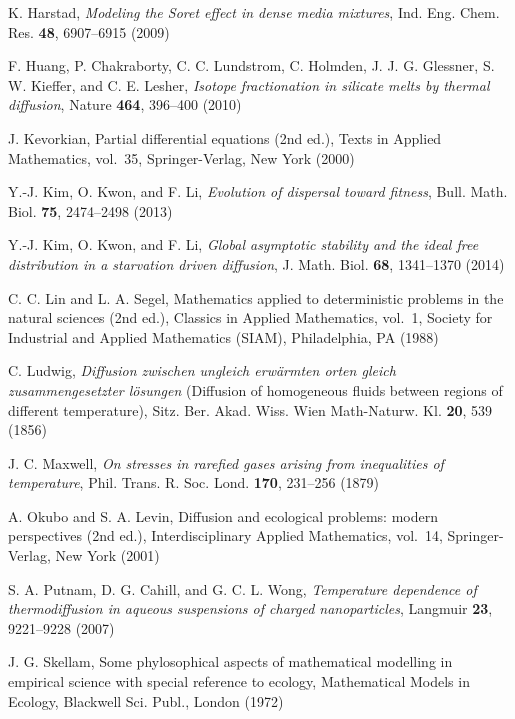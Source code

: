 \documentclass[11pt]{amsart}
\begin{document}
\begin{thebibliography}{10}
K. Harstad, \emph{Modeling the Soret effect in dense media mixtures},
  Ind. Eng. Chem. Res. \textbf{48}, 6907--6915 (2009)

F. Huang, P. Chakraborty, C. C. Lundstrom, C. Holmden, J. J. G. Glessner, S. W.
  Kieffer, and C. E. Lesher, \emph{Isotope fractionation in silicate melts by
  thermal diffusion}, Nature \textbf{464}, 396--400 (2010)

J. Kevorkian, Partial differential equations (2nd ed.), Texts in
  Applied Mathematics, vol.~35, Springer-Verlag, New York (2000)

Y.-J. Kim, O. Kwon, and F. Li, \emph{Evolution of dispersal toward
  fitness}, Bull. Math. Biol. \textbf{75}, 2474--2498 (2013)

Y.-J. Kim, O. Kwon, and F. Li, \emph{Global asymptotic stability and the ideal free distribution in a starvation driven diffusion}, J. Math. Biol. \textbf{68},  1341--1370 (2014)

C. C. Lin and L. A. Segel, Mathematics applied to deterministic problems
  in the natural sciences (2nd ed.), Classics in Applied Mathematics,
  vol.~1, Society for Industrial and Applied Mathematics (SIAM), Philadelphia,
  PA (1988)

C. Ludwig, \emph{Diffusion zwischen ungleich erw\"{a}rmten orten gleich zusammengesetzter l\"{o}sungen} (Diffusion of homogeneous fluids between regions of different temperature), Sitz. Ber. Akad. Wiss. Wien Math-Naturw. Kl. \textbf{20}, 539 (1856)

J. C. Maxwell, \emph{On stresses in rarefied gases arising from inequalities of
  temperature}, Phil. Trans. R. Soc. Lond. \textbf{170}, 231--256 (1879)

A. Okubo and S. A. Levin, Diffusion and ecological problems: modern
  perspectives (2nd ed.), Interdisciplinary Applied Mathematics, vol.~14,
  Springer-Verlag, New York (2001)

S. A. Putnam, D. G. Cahill, and G. C. L. Wong, \emph{Temperature dependence of
  thermodiffusion in aqueous suspensions of charged nanoparticles}, Langmuir
  \textbf{23}, 9221--9228 (2007)

J. G. Skellam, Some phylosophical aspects of mathematical modelling in
  empirical science with special reference to ecology, Mathematical Models in
  Ecology, Blackwell Sci. Publ., London (1972)


\end{thebibliography}
\end{document}
